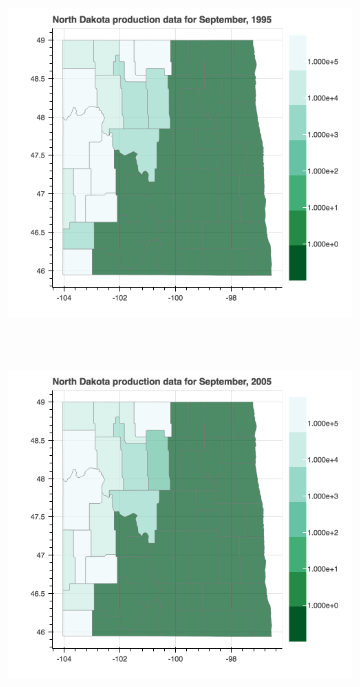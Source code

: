 \documentclass[11pt,letterpaper]{article}
\begin{document}
\begin{figure}[h!]
\begin{subfigure}{0.3\textwidth}
\includegraphics[width=1.2\linewidth]{nd_prod_1995}
\end{subfigure}
~
\begin{subfigure}{0.3\textwidth}
\includegraphics[width=1.2\linewidth]{nd_prod_2005}
\end{subfigure}
~
\begin{subfigure}{0.3\textwidth}

\end{subfigure}
\end{figure}
\end{document}
